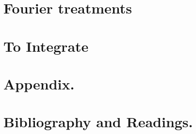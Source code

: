 \documentclass[12pt,leqno]{book}
\begin{document}
\part{Fourier treatments}









\part{To Integrate}


\part{Appendix.}



\part{Bibliography and Readings.}




%





%
\end{document}
